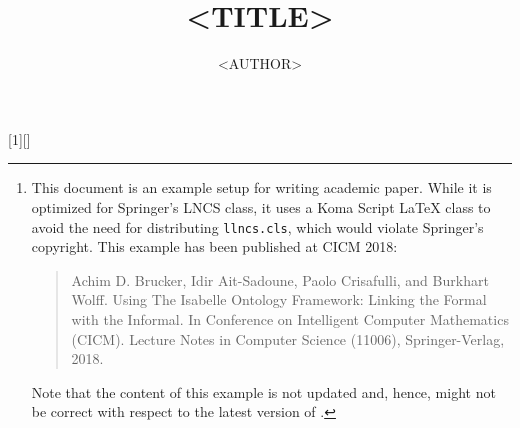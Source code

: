 


%
%
\usepackage{textcomp}
\usepackage{xcolor}
\usepackage{paralist}
\usepackage{listings}
\usepackage{lstisadof}
\usepackage{xspace}
\usepackage[draft]{fixme}

%

[1][]{\lstset{style=displaybash, #1}}{}
\def\inlinebash{\lstinline[style=bash, breaklines=true,columns=fullflexible]}

\usepackage[caption]{subfig}
\usepackage[size=footnotesize]{caption}

\newcommand{\ie}{i.e.}
\newcommand{\eg}{e.g.}


\subject{Example of an Academic Paper\footnote{%
  This document is an example setup for writing academic paper. While
  it is optimized for Springer's LNCS class, it uses a Koma Script
  LaTeX class to avoid the need for distributing \texttt{llncs.cls},
  which would violate Springer's copyright. This example has been
  published at CICM 2018:
    \protect\begin{quote}
      Achim D. Brucker, Idir Ait-Sadoune, Paolo Crisafulli, and
      Burkhart Wolff. Using The Isabelle Ontology Framework: Linking
      the Formal with the Informal. In Conference on Intelligent
      Computer Mathematics (CICM). Lecture Notes in Computer Science
      (11006), Springer-Verlag, 2018. 
    \protect\end{quote}
    Note that the content of this example is not updated and, hence,
    might not be correct with respect to the latest version of
    \isadof{}. 
    }}


\title{<TITLE>}
\author{<AUTHOR>}

